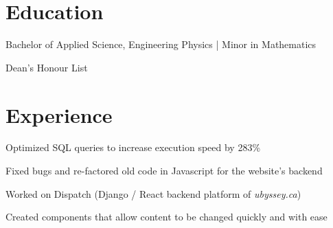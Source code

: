\documentclass[]{deedy-resume-openfont}
\begin{document}
    
    
    
    

    \section{Education}
    \begin{tightemize}
    \item Bachelor of Applied Science, Engineering Physics | Minor in Mathematics \\
    \item Dean's Honour List
	\end{tightemize}
	\sectionsep
    
    \section{Experience}
    
    \begin{tightemize}
    \item Optimized SQL queries to increase execution speed by 283\%
    \item Fixed bugs and re-factored old code in Javascript for the website’s backend
    \end{tightemize}
    \sectionsep
    
    \begin{tightemize}
    \item Worked on Dispatch (Django / React backend platform of \textit{ubyssey.ca})
    \item Created components that allow content to be changed quickly and with ease
    \end{tightemize}
    \sectionsep
    
\end{document}
